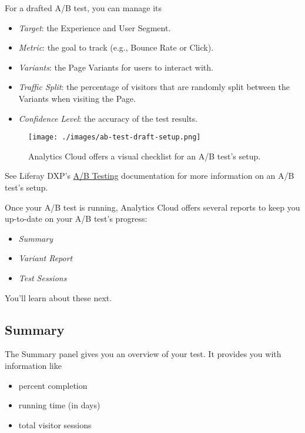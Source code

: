 For a drafted A/B test, you can manage its

\begin{itemize}
\tightlist
\item
  \emph{Target}: the Experience and User Segment.
\item
  \emph{Metric}: the goal to track (e.g., Bounce Rate or Click).
\item
  \emph{Variants}: the Page Variants for users to interact with.
\item
  \emph{Traffic Split}: the percentage of visitors that are randomly
  split between the Variants when visiting the Page.
\item
  \emph{Confidence Level}: the accuracy of the test results.
\end{itemize}

\begin{figure}
\centering
\texttt{[image: ./images/ab-test-draft-setup.png]}
\caption{Analytics Cloud offers a visual checklist for an A/B test's
setup.}
\end{figure}

See Liferay DXP's
\href{/docs/7-2/user/-/knowledge_base/u/a-b-testing}{A/B Testing}
documentation for more information on an A/B test's setup.

Once your A/B test is running, Analytics Cloud offers several reports to
keep you up-to-date on your A/B test's progress:

\begin{itemize}
\tightlist
\item
  \emph{Summary}
\item
  \emph{Variant Report}
\item
  \emph{Test Sessions}
\end{itemize}

You'll learn about these next.

\subsection{Summary}\label{summary}

The Summary panel gives you an overview of your test. It provides you
with information like

\begin{itemize}
\tightlist
\item
  percent completion
\item
  running time (in days)
\item
  total visitor sessions
\end{itemize}

